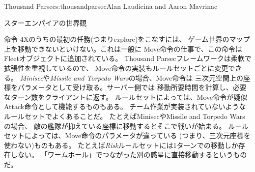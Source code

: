 \begin{aosachapter}{Thousand Parsec}{s:thousandparsec}{Alan Laudicina and Aaron Mavrinac}
\begin{aosasect1}{スターエンパイアの世界観}
\begin{aosasect2}{命令}
4Xのうちの最初の任務(つまりe\emph{x}plore)をこなすには、
ゲーム世界のマップ上を移動できないといけない。これは一般に
Move命令の仕事で、この命令はFleetオブジェクトに追加されている。
Thousand Parsecフレームワークは柔軟で拡張性を重視しているので、
Move命令の実装もルールセットごとに変更できる。
\emph{Minisec}や\emph{Missile and Torpedo Wars}の場合、Move命令は
三次元空間上の座標をパラメータとして受け取る。サーバー側では
移動所要時間を計算し、必要なターン数をクライアントに返す。
ルールセットによっては、Move命令が疑似Attack命令として機能するものもある。
チーム作業が実装されていないようなルールセットでよくあることだ。
たとえばMinisecやMissile and Torpedo Warsの場合、
敵の艦隊が抑えている座標に移動するとそこで戦いが始まる。
ルールセットによっては、Move命令のパラメータが違っている
(つまり、三次元座標を使わない)ものもある。
たとえば\emph{Risk}ルールセットには1ターンでの移動しか存在しない。
「ワームホール」でつながった別の惑星に直接移動するというものだ。


\end{aosasect2}
\end{aosasect1}
\end{aosachapter}
